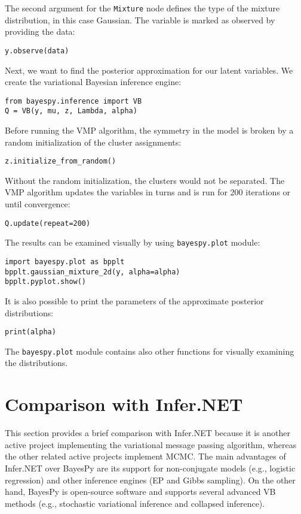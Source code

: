 \documentclass[twoside,11pt]{article}
\begin{document}
The second argument for the \texttt{Mixture} node defines the type of the
mixture distribution, in this case Gaussian.  The variable is marked as observed
by providing the data:
\begin{lstlisting}
y.observe(data)
\end{lstlisting}
Next, we want to find the posterior approximation for our latent variables.  We
create the variational Bayesian inference engine:
\begin{lstlisting}
from bayespy.inference import VB
Q = VB(y, mu, z, Lambda, alpha)
\end{lstlisting}
Before running the VMP algorithm, the symmetry in the model is broken by
a random initialization of the cluster assignments:
\begin{lstlisting}
z.initialize_from_random()
\end{lstlisting}
Without the random initialization, the clusters would not be separated.  The VMP
algorithm updates the variables in turns and is run for 200 iterations or until
convergence:
\begin{lstlisting}
Q.update(repeat=200)
\end{lstlisting}
The results can be examined visually by using \texttt{bayespy.plot} module:
\begin{lstlisting}
import bayespy.plot as bpplt
bpplt.gaussian_mixture_2d(y, alpha=alpha)
bpplt.pyplot.show()
\end{lstlisting}
It is also possible to print the parameters of the approximate posterior
distributions:
\begin{lstlisting}
print(alpha)
\end{lstlisting}
The \texttt{bayespy.plot} module contains also other functions for visually
examining the distributions.


\section{Comparison with Infer.NET}


This section provides a brief comparison with Infer.NET because it is another
active project implementing the variational message passing algorithm, whereas
the other related active projects implement MCMC.  The main advantages of
Infer.NET over BayesPy are its support for non-conjugate models (e.g., logistic
regression) and other inference engines (EP and Gibbs sampling).  On the other
hand, BayesPy is open-source software and supports several advanced VB methods
(e.g., stochastic variational inference and collapsed inference).
\end{document}
